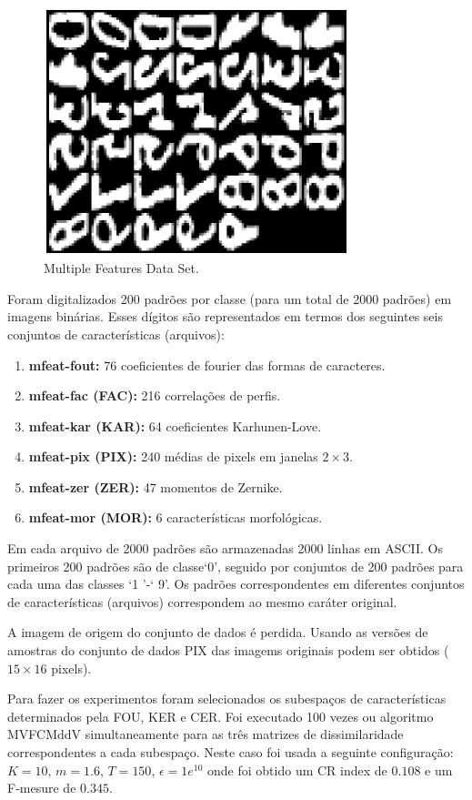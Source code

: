 \documentclass[12pt]{article}
\begin{document}
\begin{figure}[h]
\centering
\includegraphics[width=3.5in]{../out/data-base.eps}
\caption{Multiple Features Data Set.}
\label{fig:data_base}
\end{figure}  

Foram digitalizados 200 padrões por classe (para um total de 2000 padrões) em imagens binárias. Esses dígitos são representados em termos dos seguintes seis conjuntos de características (arquivos):

\begin{enumerate}
\item \textbf{mfeat-fout:} 76 coeficientes de fourier das formas de caracteres.
\item \textbf{mfeat-fac (FAC):} 216 correlações de perfis.
\item \textbf{mfeat-kar (KAR):} 64 coeficientes Karhunen-Love.
\item \textbf{mfeat-pix (PIX):} 240 médias de pixels em janelas $ 2 \times 3 $.
\item \textbf{mfeat-zer (ZER):} 47 momentos de Zernike.
\item \textbf{mfeat-mor (MOR):} 6 características morfológicas.
\end{enumerate}

Em cada arquivo de 2000 padrões são armazenadas 2000 linhas em ASCII. Os primeiros 200 padrões são de classe`0', seguido por conjuntos de 200 padrões para cada uma das classes `1 '-` 9'. Os padrões correspondentes em diferentes conjuntos de características (arquivos) correspondem ao mesmo caráter original.

A imagem de origem do conjunto de dados é perdida.
Usando as versões de amostras  do conjunto de dados PIX das imagems originais podem ser obtidos ($15 \times 16$ pixels).

Para fazer os experimentos foram selecionados os subespaços de características determinados pela FOU, KER e CER. Foi executado 100 vezes ou algoritmo MVFCMddV simultaneamente para as três matrizes de dissimilaridade correspondentes a cada subespaço. Neste caso foi usada a seguinte configuração: $K =10$, $m = 1.6$, $T = 150$, $\epsilon = 1e^{10}$ onde foi obtido um CR index de $0.108$ e um F-mesure de $0.345$. 
\end{document}
